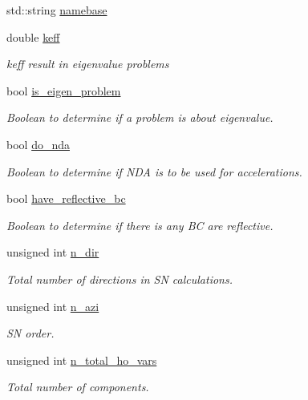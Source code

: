 \begin{DoxyCompactItemize}
std\+::string \hyperlink{class_bart_driver_a34229e58237aaac1551db7a3ec140e1c}{namebase}
\item 
double \hyperlink{class_bart_driver_a459fab858171aa05e4618d6d9d327e87}{keff}
\begin{DoxyCompactList}\small\item\em keff result in eigenvalue problems \end{DoxyCompactList}\item 
bool \hyperlink{class_bart_driver_a6ee26434a788284182df94da5d71ca12}{is\+\_\+eigen\+\_\+problem}
\begin{DoxyCompactList}\small\item\em Boolean to determine if a problem is about eigenvalue. \end{DoxyCompactList}\item 
bool \hyperlink{class_bart_driver_acb7aa4c65a18deef5e1be7a3477d1b12}{do\+\_\+nda}
\begin{DoxyCompactList}\small\item\em Boolean to determine if N\+DA is to be used for accelerations. \end{DoxyCompactList}\item 
bool \hyperlink{class_bart_driver_ad42739169c4b4b97014c53a616f2d1ee}{have\+\_\+reflective\+\_\+bc}
\begin{DoxyCompactList}\small\item\em Boolean to determine if there is any BC are reflective. \end{DoxyCompactList}\item 
unsigned int \hyperlink{class_bart_driver_aa1694538581e7941bbda0960bd3c7e39}{n\+\_\+dir}
\begin{DoxyCompactList}\small\item\em Total number of directions in SN calculations. \end{DoxyCompactList}\item 
unsigned int \hyperlink{class_bart_driver_a3726013dac04d13b87e35cb0c3b8b557}{n\+\_\+azi}
\begin{DoxyCompactList}\small\item\em SN order. \end{DoxyCompactList}\item 
unsigned int \hyperlink{class_bart_driver_ab290f0bd63869bf124163f68e1be1a6a}{n\+\_\+total\+\_\+ho\+\_\+vars}
\begin{DoxyCompactList}\small\item\em Total number of components. \end{DoxyCompactList}\item 

\end{DoxyCompactItemize}
